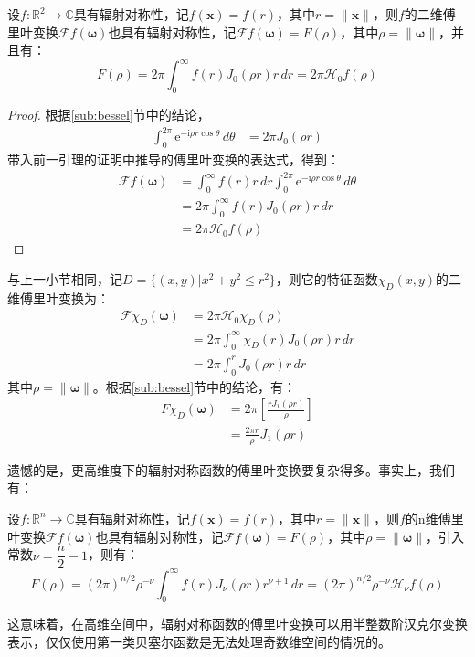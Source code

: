 \begin{theorem}
    设$f:\mathbb{R}^2\to\mathbb{C}$具有辐射对称性，记$f(\mathbf{x})=f(r)$，其中$r=\|\mathbf{x}\|$，则$f$的二维傅里叶变换$\mathcal{F} f(\boldsymbol{\omega})$也具有辐射对称性，记$\mathcal{F} f(\boldsymbol{\omega})=F(\rho)$，其中$\rho=\|\boldsymbol{\omega}\|$，并且有：
    \[F(\rho)=2\pi \int_0^{\infty}f(r)J_0(\rho r)r\,dr=2\pi\mathcal{H}_0 f(\rho)\]
\end{theorem}
\begin{proof}
    根据\ref{sub:bessel}节中的结论，\begin{align*}
        \int_{0}^{2\pi}\mathrm{e}^{-\mathrm{i} \rho r \cos\theta}\,d\theta&=2\pi J_0(\rho r)
    \end{align*}
    带入前一引理的证明中推导的傅里叶变换的表达式，得到：
    \begin{align*}
        \mathcal{F} f(\boldsymbol{\omega})&=\int_0^{\infty}f(r)r\,dr\int_0^{2\pi}\mathrm{e}^{-\mathrm{i} \rho r \cos\theta}\,d\theta\\
        &=2\pi \int_0^{\infty}f(r)J_0(\rho r)r\,dr\\
        &=2\pi \mathcal{H} _0 f(\rho)
    \end{align*}
\end{proof}

\begin{example}[圆形特征函数的傅里叶变换]
    与上一小节相同，记$D=\{(x,y)|x^2+y^2\leq r^2\}$，则它的特征函数$\chi_D(x,y)$的二维傅里叶变换为：
    \begin{align*}
        \mathcal{F} \chi_D(\boldsymbol{\omega})&=2\pi\mathcal{H}_0 \chi_D(\rho)\\
        &=2\pi \int_0^{\infty}\chi_D(r)J_0(\rho r)r\,dr\\
        &=2\pi \int_0^{r}J_0(\rho r)r\,dr
    \end{align*}
    其中$\rho=\|\boldsymbol{\omega}\|$。根据\ref{sub:bessel}节中的结论，有：
    \begin{align*}
        F\chi_D(\boldsymbol{\omega})&=2\pi \left[\frac{r J_1(\rho r)}{\rho}\right]\\
        &=\frac{2\pi r}{\rho}J_1(\rho r)
    \end{align*}
\end{example}

遗憾的是，更高维度下的辐射对称函数的傅里叶变换要复杂得多。事实上，我们有：
\begin{claim}
    设$f:\mathbb{R}^n\to\mathbb{C}$具有辐射对称性，记$f(\mathbf{x})=f(r)$，其中$r=\|\mathbf{x}\|$，则$f$的n维傅里叶变换$\mathcal{F} f(\boldsymbol{\omega})$也具有辐射对称性，记$\mathcal{F} f(\boldsymbol{\omega})=F(\rho)$，其中$\rho=\|\boldsymbol{\omega}\|$，引入常数$\nu=\dfrac{n}{2}-1$，则有：
    \[F(\rho)=(2\pi)^{n/2}\rho^{-\nu}\int_0^{\infty}f(r)J_{\nu}(\rho r)r^{\nu+1}\,dr=(2\pi)^{n/2}\rho^{-\nu}\mathcal{H}_\nu f(\rho)\]
\end{claim}

这意味着，在高维空间中，辐射对称函数的傅里叶变换可以用半整数阶汉克尔变换表示，仅仅使用第一类贝塞尔函数是无法处理奇数维空间的情况的。
